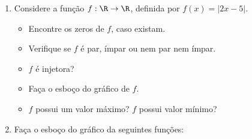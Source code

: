 \begin{enumerate}
\begin{minipage}[t]{.44\textwidth}
\begin{itemize}
\item[a)] $ \vert 5x-8\vert \leq 2$
\item[b)] $|2x-3| \geq 7$
\end{itemize}
\end{minipage}
\begin{minipage}[t]{.44\textwidth}
\begin{itemize}
\item[c)]$|x^2-9|+x \leq 3$
\item[d)] $|x-2|+ |x+8| \geq 2x+12$
\end{itemize}
\end{minipage}
\item Considere a função $f: \R \to \R$, definida por $f(x)= | 2x-5|$.
\begin{itemize}
\item[a)] Encontre os zeros de $f$, caso existam.
\item[b)] Verifique se $f$ é par, ímpar ou nem par nem ímpar.
\item[c)] $f$ é injetora?
\item[d)] Faça o esboço do gráfico de $f$.
\item[e)] $f$ possui um valor máximo? $f$ possui valor mínimo?
\end{itemize}

\item Faça o esboço do gráfico da seguintes funções:


\end{enumerate}
